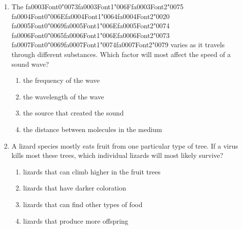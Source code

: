 \documentclass[12pt]{article}
\begin{document}
\begin{enumerate}[label=\arabic*.]
\begin{enumerate}[label=(\alph*)]
    \item A pure substance is normally found as a solid at room temperature.
\end{enumerate}
\item The {\csname fa0003Font0\endcsname\char"0073}{\csname fa0003Font1\endcsname\char"006F}{\csname fa0003Font2\endcsname\char"0075} {\csname fa0004Font0\endcsname\char"006E}{\csname fa0004Font1\endcsname\char"0064}{\csname fa0004Font2\endcsname\char"0020} {\csname fa0005Font0\endcsname\char"0069}{\csname fa0005Font1\endcsname\char"006E}{\csname fa0005Font2\endcsname\char"0074} {\csname fa0006Font0\endcsname\char"0065}{\csname fa0006Font1\endcsname\char"006E}{\csname fa0006Font2\endcsname\char"0073} {\csname fa0007Font0\endcsname\char"0069}{\csname fa0007Font1\endcsname\char"0074}{\csname fa0007Font2\endcsname\char"0079} varies as it travels through different substances. Which factor
will most affect the speed of a sound wave?
\begin{enumerate}[label=(\alph*)]
    \item the frequency of the wave
    \item the wavelength of the wave
    \item the source that created the sound
    \item the distance between molecules in the medium
\end{enumerate}
\item A lizard species mostly eats fruit from one particular type of tree. If a virus kills most
these trees, which individual lizards will most likely survive?
\begin{enumerate}[label=(\alph*)]
    \item lizards that can climb higher in the fruit trees
    \item lizards that have darker coloration
    \item lizards that can find other types of food
    \item lizards that produce more offspring
\end{enumerate}
\end{enumerate}
\end{document}
